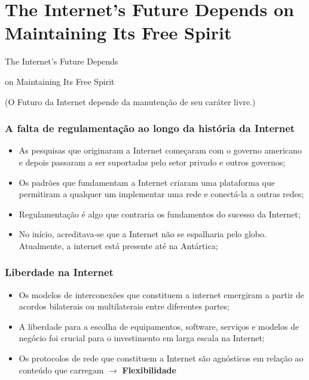\documentclass{beamer}
\begin{document}

\section{The Internet's Future Depends on Maintaining Its Free Spirit}


\begin{frame}
\huge{\centerline{The Internet's Future Depends}}
\huge{\centerline{on Maintaining Its Free Spirit}} 
\normalsize{\centerline{(O Futuro da Internet depende da manutenção de seu caráter livre.)}}
\end{frame}


\begin{frame}
\frametitle{A falta de regulamentação ao longo da história da Internet}
\begin{itemize}
\item As pesquisas que originaram a Internet começaram com o governo americano e depois passaram a ser suportadas pelo setor privado e outros governos;
\item Os padrões que fundamentam a Internet criaram uma plataforma que permitiram a qualquer um implementar uma rede e conectá-la a outras redes;
\item Regulamentação é algo que contraria os fundamentos do sucesso da Internet;
\item No início, acreditava-se que a Internet não se espalharia pelo globo. Atualmente, a internet está presente até na Antártica;
\end{itemize}
\end{frame}


\begin{frame}
\frametitle{Liberdade na Internet}
\begin{itemize}
\item Os modelos de interconexões que constituem a internet emergiram a partir de acordos bilaterais ou multilaterais entre diferentes partes;
\item A liberdade para a escolha de equipamentos, software, serviços e modelos de negócio foi crucial para o investimento em larga escala na Internet;
\item Os protocolos de rede que constituem a Internet são agnósticos em relação ao conteúdo que carregam $\rightarrow$ \textbf{Flexibilidade}
\end{itemize}
\end{frame}
\end{document}

